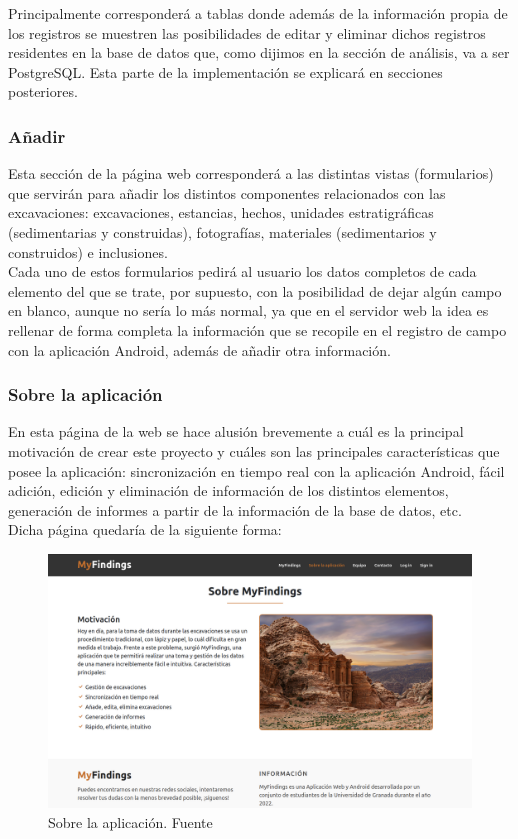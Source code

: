     Principalmente corresponderá a tablas donde además de la información propia
    de los registros se muestren las posibilidades de editar y eliminar dichos registros
    residentes en la base de datos que, como dijimos en la sección de análisis, va a ser
    PostgreSQL. Esta parte de la implementación se explicará en secciones posteriores.

    \newpage \subsubsection{Añadir}
    Esta sección de la página web corresponderá a las distintas vistas (formularios) que
    servirán para añadir los distintos componentes relacionados con las excavaciones:
    excavaciones, estancias, hechos, unidades estratigráficas (sedimentarias y construidas),
    fotografías, materiales (sedimentarios y construidos) e inclusiones.\\

    Cada uno de estos formularios pedirá al usuario los datos completos de cada elemento del
    que se trate, por supuesto, con la posibilidad de dejar algún campo en blanco, aunque
    no sería lo más normal, ya que en el servidor web la idea es rellenar de forma completa
    la información que se recopile en el registro de campo con la aplicación Android, además
    de añadir otra información.

    \subsubsection{Sobre la aplicación}
    En esta página de la web se hace alusión brevemente a cuál es la principal motivación
    de crear este proyecto y cuáles son las principales características que posee la
    aplicación: sincronización en tiempo real con la aplicación Android, fácil
    adición, edición y eliminación de información de los distintos elementos, generación
    de informes a partir de la información de la base de datos, etc.\\

    Dicha página quedaría de la siguiente forma:
        
        \begin{figure}[H]
            \centering
            \includegraphics[scale=0.23]{imagenes/about.png}
            \caption[Sobre la aplicación]{Sobre la aplicación. Fuente \cite{petra-ad-deir}}
            \label{fig:about}
        \end{figure}

